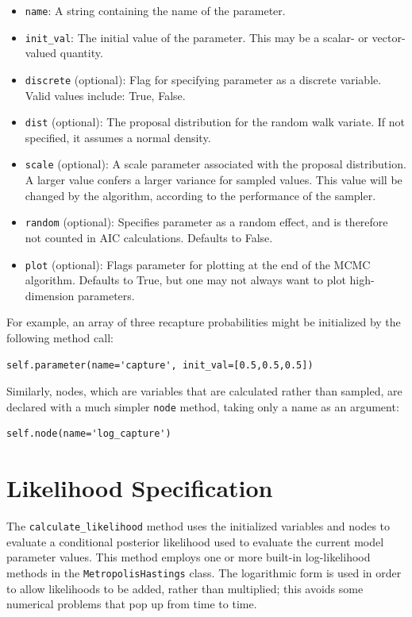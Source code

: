 \documentclass[]{book}
\begin{document}
\begin{itemize}

\item \verb=name=: A string containing the name of the parameter.
\item \verb=init_val=: The initial value of the parameter. This may be a scalar- or vector-valued quantity.
\item \verb=discrete= (optional): Flag for specifying parameter as a discrete variable. Valid values include: True, False.
\item \verb=dist= (optional): The proposal distribution for the random walk variate. If not specified, it assumes a normal density.
\item \verb=scale= (optional): A scale parameter associated with the proposal distribution. A larger value confers a larger variance for sampled values. This value will be changed by the algorithm, according to the performance of the sampler.
\item \verb=random= (optional): Specifies parameter as a random effect, and is therefore not counted in AIC calculations. Defaults to False.
\item \verb=plot= (optional): Flags parameter for plotting at the end of the MCMC algorithm. Defaults to True, but one may not always want to plot high-dimension parameters.
\end{itemize}
For example, an array of three recapture probabilities might be initialized by the following method call:
\begin{verbatim}
self.parameter(name='capture', init_val=[0.5,0.5,0.5])
\end{verbatim}

Similarly, nodes, which are variables that are calculated rather than sampled, are declared with a much simpler \verb=node= method, taking only a name as an argument:
\begin{verbatim}
self.node(name='log_capture')
\end{verbatim}

\section{Likelihood Specification}\label{sec:likelihood_specification}

The \verb=calculate_likelihood= method uses the initialized variables and nodes to evaluate a conditional posterior likelihood used to evaluate the current model parameter values. This method employs one or more built-in log-likelihood methods in the \verb=MetropolisHastings= class. The logarithmic form is used in order to allow likelihoods to be added, rather than multiplied; this avoids some numerical problems that pop up from time to time. 
\end{document}
